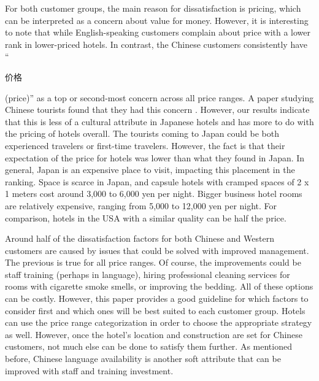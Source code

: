 \documentclass[smallextended,natbib]{svjour3}       %
\begin{document}
    For both customer groups, the main reason for dissatisfaction is pricing, which can be interpreted as a concern about value for money. However, it is interesting to note that while English-speaking customers complain about price with a lower rank in lower-priced hotels. In contrast, the Chinese customers consistently have ``\begin{CJK}{UTF8}{gbsn}价格\end{CJK} (price)'' as a top or second-most concern across all price ranges. A paper studying Chinese tourists found that they had this concern \cite[][]{truong2009}. However, our results indicate that this is less of a cultural attribute in Japanese hotels and has more to do with the pricing of hotels overall. The tourists coming to Japan could be both experienced travelers or first-time travelers. However, the fact is that their expectation of the price for hotels was lower than what they found in Japan. In general, Japan is an expensive place to visit, impacting this placement in the ranking. Space is scarce in Japan, and capsule hotels with cramped spaces of 2 x 1 meters cost around 3,000 to 6,000 yen per night. Bigger business hotel rooms are relatively expensive, ranging from 5,000 to 12,000 yen per night. For comparison, hotels in the USA with a similar quality can be half the price.

    Around half of the dissatisfaction factors for both Chinese and Western customers are caused by issues that could be solved with improved management. The previous is true for all price ranges. Of course, the improvements could be staff training (perhaps in language), hiring professional cleaning services for rooms with cigarette smoke smells, or improving the bedding. All of these options can be costly. However, this paper provides a good guideline for which factors to consider first and which ones will be best suited to each customer group. Hotels can use the price range categorization in order to choose the appropriate strategy as well. However, once the hotel's location and construction are set for Chinese customers, not much else can be done to satisfy them further. As mentioned before, Chinese language availability is another soft attribute that can be improved with staff and training investment.
\end{document}
